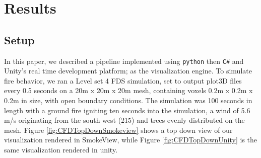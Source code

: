 
\chapter{Results} %

\label{Chapter3} %

\section{Setup}

In this paper, we described a pipeline implemented using \texttt{python} then \texttt{C\#} and Unity’s real time development platform; as the visualization engine. To simulate fire behavior, we ran a Level set 4 FDS simulation, set to output plot3D files every 0.5 seconds on a 20m x 20m x 20m mesh, containing voxels 0.2m x 0.2m x 0.2m in size, with open boundary conditions. The simulation was 100 seconds in length with a ground fire igniting ten seconds into the simulation, a wind of 5.6 m/s originating from the south west (215\textdegree) and trees evenly distributed on the mesh. Figure \ref{fig:CFDTopDownSmokeview} shows a top down view of our visualization rendered in SmokeView, while Figure \ref{fig:CFDTopDownUnity} is the same visualization rendered in unity. \par 

